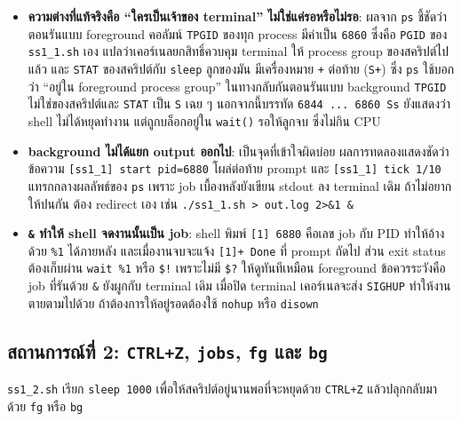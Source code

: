 \documentclass[a4paper,11pt]{article}
\newcommand{\code}[1]{\texttt{#1}}
\begin{document}
\begin{itemize}[leftmargin=*]
  \item \textbf{ความต่างที่แท้จริงคือ ``ใครเป็นเจ้าของ terminal'' ไม่ใช่แค่รอหรือไม่รอ}:
        ผลจาก \code{ps} ชี้ชัดว่าตอนรันแบบ foreground คอลัมน์ \code{TPGID}
        ของทุก process มีค่าเป็น \code{6860} ซึ่งคือ \code{PGID} ของ
        \code{ss1\_1.sh} เอง แปลว่าเคอร์เนลยกสิทธิ์ควบคุม terminal ให้ process group
        ของสคริปต์ไปแล้ว และ \code{STAT} ของสคริปต์กับ \code{sleep} ลูกของมัน
        มีเครื่องหมาย \code{+} ต่อท้าย (\code{S+}) ซึ่ง \code{ps} ใช้บอกว่า
        ``อยู่ใน foreground process group'' ในทางกลับกันตอนรันแบบ background
        \code{TPGID} ไม่ใช่ของสคริปต์และ \code{STAT} เป็น \code{S} เฉย ๆ
        นอกจากนี้บรรทัด \code{6844 ... 6860 Ss} ยังแสดงว่า shell ไม่ได้หยุดทำงาน
        แต่ถูกบล็อกอยู่ใน \code{wait()} รอให้ลูกจบ ซึ่งไม่กิน CPU

  \item \textbf{background ไม่ได้แยก output ออกไป}: เป็นจุดที่เข้าใจผิดบ่อย
        ผลการทดลองแสดงชัดว่าข้อความ \code{[ss1\_1] start pid=6880} โผล่ต่อท้าย prompt
        และ \code{[ss1\_1] tick 1/10} แทรกกลางผลลัพธ์ของ \code{ps}
        เพราะ job เบื้องหลังยังเขียน stdout ลง terminal เดิม ถ้าไม่อยากให้ปนกัน
        ต้อง redirect เอง เช่น \code{./ss1\_1.sh > out.log 2>\&1 \&}

  \item \textbf{\code{\&} ทำให้ shell จดงานนั้นเป็น job}: shell พิมพ์ \code{[1] 6880}
        คือเลข job กับ PID ทำให้อ้างด้วย \code{\%1} ได้ภายหลัง และเมื่องานจบจะแจ้ง
        \code{[1]+ Done} ที่ prompt ถัดไป ส่วน exit status ต้องเก็บผ่าน
        \code{wait \%1} หรือ \code{\$!} เพราะไม่มี \code{\$?} ให้ดูทันทีเหมือน foreground
        ข้อควรระวังคือ job ที่รันด้วย \code{\&} ยังผูกกับ terminal เดิม
        เมื่อปิด terminal เคอร์เนลจะส่ง \code{SIGHUP} ทำให้งานตายตามไปด้วย
        ถ้าต้องการให้อยู่รอดต้องใช้ \code{nohup} หรือ \code{disown}
\end{itemize}

\subsection{สถานการณ์ที่ 2: \code{CTRL+Z}, \code{jobs}, \code{fg} และ \code{bg}}

\code{ss1\_2.sh} เรียก \code{sleep 1000} เพื่อให้สคริปต์อยู่นานพอที่จะหยุดด้วย
\code{CTRL+Z} แล้วปลุกกลับมาด้วย \code{fg} หรือ \code{bg}
\end{document}
